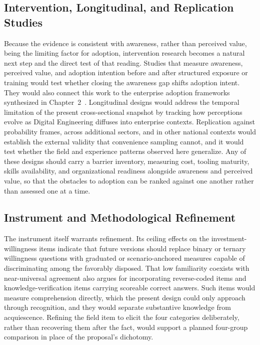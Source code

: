 \subsection{Intervention, Longitudinal, and Replication Studies}

Because the evidence is consistent with awareness, rather than perceived value, being the limiting factor for adoption, intervention research becomes a natural next step and the direct test of that reading. Studies that measure awareness, perceived value, and adoption intention before and after structured exposure or training would test whether closing the awareness gap shifts adoption intent. They would also connect this work to the enterprise adoption frameworks synthesized in Chapter~2~\parencite{McDermott_2024}. Longitudinal designs would address the temporal limitation of the present cross-sectional snapshot by tracking how perceptions evolve as Digital Engineering diffuses into enterprise contexts. Replication against probability frames, across additional sectors, and in other national contexts would establish the external validity that convenience sampling cannot, and it would test whether the field and experience patterns observed here generalize. Any of these designs should carry a barrier inventory, measuring cost, tooling maturity, skills availability, and organizational readiness alongside awareness and perceived value, so that the obstacles to adoption can be ranked against one another rather than assessed one at a time.

\subsection{Instrument and Methodological Refinement}

The instrument itself warrants refinement. Its ceiling effects on the investment-willingness items indicate that future versions should replace binary or ternary willingness questions with graduated or scenario-anchored measures capable of discriminating among the favorably disposed. That low familiarity coexists with near-universal agreement also argues for incorporating reverse-coded items and knowledge-verification items carrying scoreable correct answers. Such items would measure comprehension directly, which the present design could only approach through recognition, and they would separate substantive knowledge from acquiescence. Refining the field item to elicit the four categories deliberately, rather than recovering them after the fact, would support a planned four-group comparison in place of the proposal's dichotomy.

